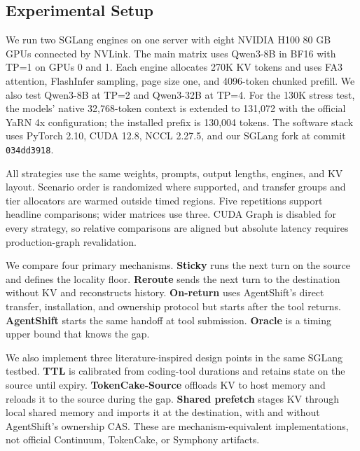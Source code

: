 \subsection{Experimental Setup}\label{experimental-setup}

We run two SGLang engines on one server with eight NVIDIA H100 80 GB GPUs connected by NVLink. The main matrix uses Qwen3-8B in BF16 with TP=1 on GPUs 0 and 1. Each engine allocates 270K KV tokens and uses FA3 attention, FlashInfer sampling, page size one, and 4096-token chunked prefill. We also test Qwen3-8B at TP=2 and Qwen3-32B at TP=4. For the 130K stress test, the models' native 32,768-token context is extended to 131,072 with the official YaRN 4x configuration; the installed prefix is 130,004 tokens. The software stack uses PyTorch 2.10, CUDA 12.8, NCCL 2.27.5, and our SGLang fork at commit \texttt{034dd3918}.

All strategies use the same weights, prompts, output lengths, engines, and KV layout. Scenario order is randomized where supported, and transfer groups and tier allocators are warmed outside timed regions. Five repetitions support headline comparisons; wider matrices use three. CUDA Graph is disabled for every strategy, so relative comparisons are aligned but absolute latency requires production-graph revalidation.

We compare four primary mechanisms. \textbf{Sticky} runs the next turn on the source and defines the locality floor. \textbf{Reroute} sends the next turn to the destination without KV and reconstructs history. \textbf{On-return} uses AgentShift's direct transfer, installation, and ownership protocol but starts after the tool returns. \textbf{AgentShift} starts the same handoff at tool submission. \textbf{Oracle} is a timing upper bound that knows the gap.

We also implement three literature-inspired design points in the same SGLang testbed. \textbf{TTL} is calibrated from coding-tool durations and retains state on the source until expiry. \textbf{TokenCake-Source} offloads KV to host memory and reloads it to the source during the gap. \textbf{Shared prefetch} stages KV through local shared memory and imports it at the destination, with and without AgentShift's ownership CAS. These are mechanism-equivalent implementations, not official Continuum, TokenCake, or Symphony artifacts.



